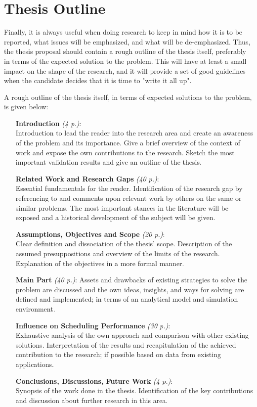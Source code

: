 \section{Thesis Outline}\label{sec:outline}
Finally, it is always useful when doing research to keep in mind how it is to be reported, what issues will be emphasized, and what will be de-emphasized. Thus, the thesis proposal should contain a rough outline of the thesis itself, preferably in terms of the expected solution to the problem. This will have at least a small impact on the shape of the research, and it will provide a set of good guidelines when the candidate decides that it is time to "write it all up".

A rough outline of the thesis itself, in terms of expected solutions to the problem, is given below:

\begin{itemize}
   \item[\textbf{Introduction} \textit{(4 p.)}:]~\\
   Introduction to lead the reader into the research area and create an awareness of the problem and its importance. Give a brief overview of the context of work and expose the own contributions to the research. Sketch the most important validation results and give an outline of the thesis.
   \item[\textbf{Related Work and Research Gaps} \textit{(40 p.)}:]~\\
   Essential fundamentals for the reader. Identification of the research gap by referencing to and comments upon relevant work by others on the same or similar problems. The most important stances in the literature will be exposed and a historical development of the subject will be given.
   \item[\textbf{Assumptions, Objectives and Scope} \textit{(20 p.)}:]~\\
   Clear definition and dissociation of the thesis' scope. Description of the assumed presuppositions and o\-ver\-view of the limits of the research. Explanation of the objectives in a more formal manner.
   \item[\textbf{Main Part} \textit{(40 p.)}:]
   Assets and drawbacks of existing strategies to solve the problem are discussed and the own ideas, insights, and ways for solving are defined and implemented; in terms of an analytical model and simulation environment.
   \item[\textbf{Influence on Scheduling Performance} \textit{(30 p.)}:]~\\
   Exhaustive analysis of the own approach and comparison with other existing solutions. Interpretation of the results and recapitulation of the achieved contribution to the research; if possible based on data from existing applications.
   \item[\textbf{Conclusions, Discussions, Future Work} \textit{(4 p.)}:]~\\
   Synopsis of the work done in the thesis. Identification of the key contributions and discussion about further research in this area.
\end{itemize}
